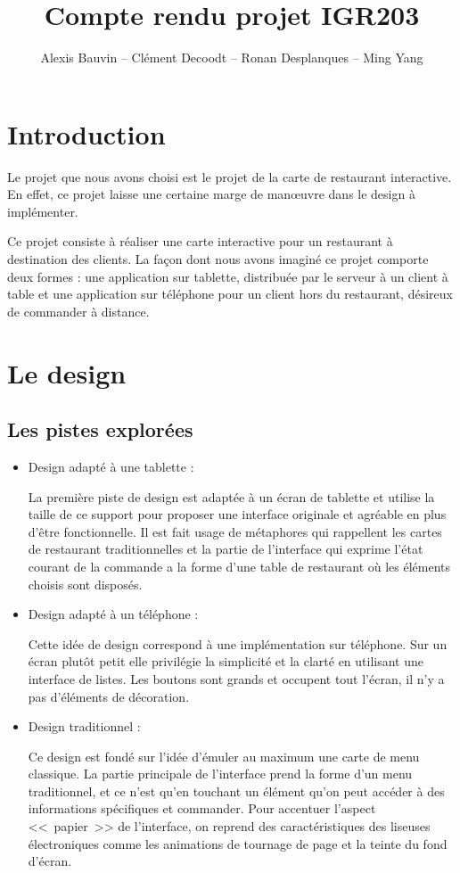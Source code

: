 \documentclass[a4paper,12pt]{article}
\title{Compte rendu projet IGR203}
\author{Alexis Bauvin -- Clément Decoodt -- Ronan Desplanques -- Ming Yang}
\begin{document}
\maketitle

\tableofcontents

\section*{Introduction}

Le projet que nous avons choisi est le projet de la carte de restaurant interactive. En effet, ce projet laisse une
certaine marge de manœuvre dans le design à implémenter.

Ce projet consiste à réaliser une carte interactive pour un restaurant à destination des clients. La façon dont nous
avons imaginé ce projet comporte deux formes : une application sur tablette, distribuée par le serveur à un client à
table et une application sur téléphone pour un client hors du restaurant, désireux de commander à distance.

\newpage

\section{Le design}

\subsection{Les pistes explorées}

\begin{itemize}
\item Design adapté à une tablette :

La première piste de design est adaptée à un écran de tablette et utilise la taille de ce support pour proposer
une interface originale et agréable en plus d'être fonctionnelle. Il est fait usage de métaphores qui rappellent
les cartes de restaurant traditionnelles et la partie de l'interface qui exprime l'état courant de la commande
a la forme d'une table de restaurant où les éléments choisis sont disposés.

\item Design adapté à un téléphone :

Cette idée de design correspond à une implémentation sur téléphone. Sur un écran plutôt petit elle privilégie la
simplicité et la clarté en utilisant une interface de listes. Les boutons sont grands et occupent tout l'écran,
il n'y a pas d'éléments de décoration.

\item Design traditionnel :

Ce design est fondé sur l'idée d'émuler au maximum une carte de menu classique. La partie principale de l'interface
prend la forme d'un menu traditionnel, et ce n'est qu'en touchant un élément qu'on peut accéder à des informations
spécifiques et commander. Pour accentuer l'aspect <<~papier~>> de l'interface, on reprend des caractéristiques des
liseuses électroniques comme les animations de tournage de page et la teinte du fond d'écran.

\end{itemize}
\end{document}
